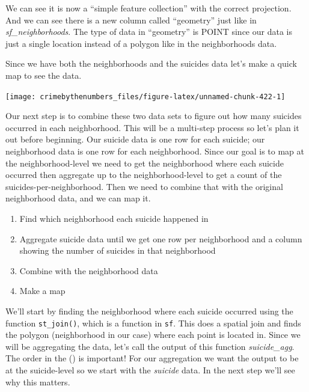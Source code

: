 \documentclass[
]{krantz}
\makeatletter
\newenvironment{Shaded}{\begin{snugshade}}{\end{snugshade}}
\newcommand{\AttributeTok}[1]{\textcolor[rgb]{0.61,0.61,0.61}{#1}}
\newcommand{\ConstantTok}[1]{\textcolor[rgb]{0,0,0}{#1}}
\newcommand{\FunctionTok}[1]{\textcolor[rgb]{0,0,0}{#1}}
\newcommand{\NormalTok}[1]{#1}
\newcommand{\SpecialCharTok}[1]{\textcolor[rgb]{0,0,0}{#1}}
\newcommand{\StringTok}[1]{\textcolor[rgb]{0.5,0.5,0.5}{#1}}
\providecommand{\tightlist}{%
  \setlength{\itemsep}{0pt}\setlength{\parskip}{0pt}}
\newenvironment{kframe}{%
\medskip{}
\setlength{\fboxsep}{.8em}
 \def\at@end@of@kframe{}%
 \ifinner\ifhmode%
  \def\at@end@of@kframe{\end{minipage}}%
  \begin{minipage}{\columnwidth}%
 \fi\fi%
 \def\FrameCommand##1{\hskip\@totalleftmargin \hskip-\fboxsep
 \colorbox{shadecolor}{##1}\hskip-\fboxsep
     \hskip-\linewidth \hskip-\@totalleftmargin \hskip\columnwidth}%
 \MakeFramed {\advance\hsize-\width
   \@totalleftmargin\z@ \linewidth\hsize
   \@setminipage}}%
 {\par\unskip\endMakeFramed%
 \at@end@of@kframe}
\renewenvironment{Shaded}{\begin{kframe}}{\end{kframe}}
\makeatother
\begin{document}
We can see it is now a ``simple feature collection'' with
the correct projection. And we can see there is a new column
called ``geometry'' just like in \emph{sf\_neighborhoods}.
The type of data in ``geometry'' is POINT since our data is
just a single location instead of a polygon like in the
neighborhoods data.

Since we have both the neighborhoods and the suicides data
let's make a quick map to see the data.

\begin{Shaded}
\end{Shaded}

\begin{center}\texttt{[image: crimebythenumbers\_files/figure-latex/unnamed-chunk-422-1]} \end{center}

Our next step is to combine these two data sets to figure
out how many suicides occurred in each neighborhood. This
will be a multi-step process so let's plan it out before
beginning. Our suicide data is one row for each suicide; our
neighborhood data is one row for each neighborhood. Since
our goal is to map at the neighborhood-level we need to get
the neighborhood where each suicide occurred then aggregate
up to the neighborhood-level to get a count of the
suicides-per-neighborhood. Then we need to combine that with
the original neighborhood data, and we can map it.

\begin{enumerate}
\def\labelenumi{\arabic{enumi}.}
\tightlist
\item
  Find which neighborhood each suicide happened in
\item
  Aggregate suicide data until we get one row per
  neighborhood and a column showing the number of suicides
  in that neighborhood
\item
  Combine with the neighborhood data
\item
  Make a map
\end{enumerate}

We'll start by finding the neighborhood where each suicide
occurred using the function \texttt{st\_join()}, which is a
function in \texttt{sf}. This does a spatial join and finds
the polygon (neighborhood in our case) where each point is
located in. Since we will be aggregating the data, let's
call the output of this function \emph{suicide\_agg}. The
order in the () is important! For our aggregation we want
the output to be at the suicide-level so we start with the
\emph{suicide} data. In the next step we'll see why this
matters.
\end{document}
